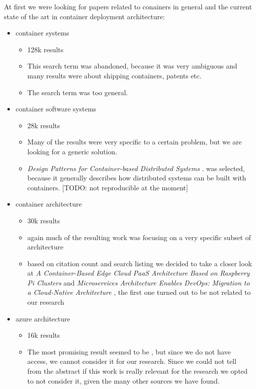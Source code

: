 \documentclass[conference]{IEEEtran}
\begin{document}
At first we were looking for papers related to conainers in general and the current state of the art in container deployment architecture:
\begin{itemize}
\item container systems
\begin{itemize}
	\item 128k results
	\item This search term was abandoned, because it was very ambiguous and many results were about shipping containers, patents etc.
	\item The search term was too general.
\end{itemize}
\item container software systems
\begin{itemize}
	\item 28k results
	\item Many of the results were very specific to a certain problem, but we are looking for a generic solution.
	\item \textit{Design Patterns for Container-based Distributed Systems} \cite{Burns2016}. was selected, because it generally describes how distributed systems can be built with containers.  [TODO: not reproducible at the moment]
\end{itemize}
\item container architecture
\begin{itemize}
	\item 30k results
	\item again much of the resulting work was focusing on a very specific subset of architecture
	\item based on citation count and search listing we decided to take a closer look at \textit{A Container-Based Edge Cloud PaaS Architecture Based on Raspberry Pi Clusters} \cite{Pahl2016} and \textit{Microservices Architecture Enables DevOps: Migration to a Cloud-Native Architecture} \cite{Balalaie2016}, the first one turned out to be not related to our research
\end{itemize}
\item azure architecture
\begin{itemize}
	\item 16k results
	\item The most promising result seemed to be \cite{Mazumdar2016}, but since we do not have access, we cannot consider it for our research. Since we could not tell from the abstract if this work is really relevant for the research we opted to not consider it, given the many other sources we have found.

\end{itemize}
\end{itemize}
\end{document}
